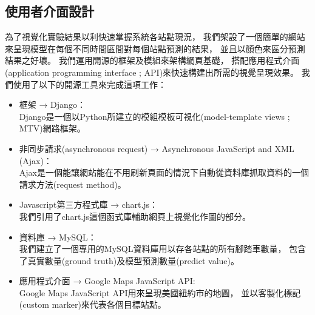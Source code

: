 \documentclass[a4paper,12pt]{extarticle}
\begin{document}
        \subsection{使用者介面設計}
            為了視覺化實驗結果以利快速掌握系統各站點現況，
            我們架設了一個簡單的網站來呈現模型在每個不同時間區間對每個站點預測的結果，
            並且以顏色來區分預測結果之好壞。
            我們運用開源的框架及模組來架構網頁基礎，
            搭配應用程式介面(application programming interface ; API)來快速構建出所需的視覺呈現效果。
            我們使用了以下的開源工具來完成這項工作：
            \begin{itemize}
                \item 框架 → Django： \\
                    Django是一個以Python所建立的模組模板可視化(model-template views ; MTV)網路框架。
                \item 非同步請求(asynchronous request) → Asynchronous JavaScript and XML (Ajax)： \\
                    Ajax是一個能讓網站能在不用刷新頁面的情況下自動從資料庫抓取資料的一個請求方法(request method)。
                \item Javascript第三方程式庫 → chart.js： \\
                    我們引用了chart.js這個函式庫輔助網頁上視覺化作圖的部分。
                \item 資料庫 → MySQL： \\
                    我們建立了一個專用的MySQL資料庫用以存各站點的所有腳踏車數量，
                    包含了真實數量(ground truth)及模型預測數量(predict value)。
                \item 應用程式介面 → Google Maps JavaScript API: \\
                    Google Maps JavaScript API用來呈現美國紐約市的地圖，
                    並以客製化標記(custom marker)來代表各個目標站點。
            \end{itemize}
\end{document}
